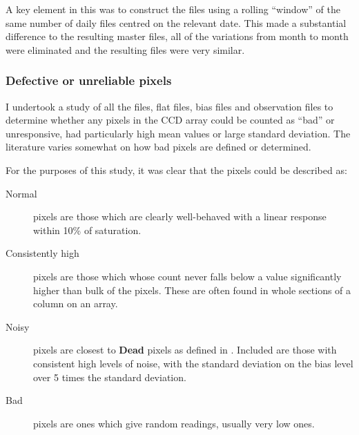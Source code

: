 A key element in this was to construct the files using a rolling ``window'' of
the same number of daily files centred on the relevant date. This made a
substantial difference to the resulting master files, all of the variations
from month to month were eliminated and the resulting files were very similar.

\subsubsection{Defective or unreliable pixels}
\protect\label{section:badpix}

I undertook a study of all the files, flat files, bias files and observation
files to determine whether any pixels in the CCD array could be counted as
``bad'' or unresponsive, had particularly high mean values or large standard
deviation. The literature varies somewhat on how bad pixels are defined or
determined.


For the purposes of this study, it was clear that the pixels could be described
as:
\begin{description}
\item[Normal] pixels are those which are clearly well-behaved with a linear
response within 10\% of saturation.
\item[Consistently high] pixels are those which whose count never falls below a
value significantly higher than bulk of the pixels. These are often found in
whole sections of a column on an array.
\item[Noisy] pixels are closest to \textbf{Dead} pixels as defined in
\citet{maslennikova20}. Included are those with consistent high levels of noise,
with the standard deviation on the bias level over 5 times the standard
deviation.
\item[Bad] pixels are ones which give random readings, usually very low ones.
\end{description}

